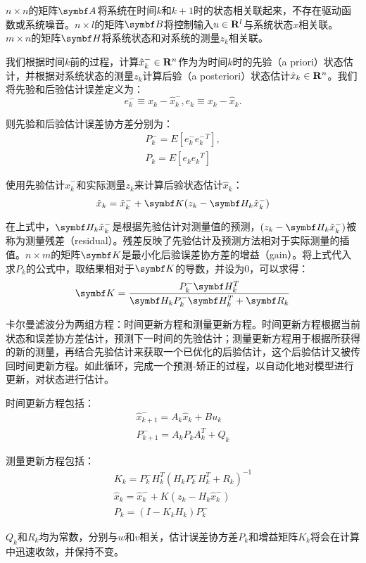   $n\times n$的矩阵$\mat{A}$将系统在时间$k$和$k+1$时的状态相关联起来，不存在驱动函数或系统噪音。$n\times l$的矩阵$\mat{B}$将控制输入$u\in \mathbf{R}^l$与系统状态$x$相关联。$m\times n$的矩阵$\mat{H}$将系统状态和对系统的测量$z_k$相关联。

  我们根据时间$k$前的过程，计算$\hat{x}^{-}_k \in \mathbf{R}^n$作为为时间$k$时的先验（a priori）状态估计，并根据对系统状态的测量$z_k$计算后验（a posteriori）状态估计$\hat{x}_k \in \mathbf{R}^n$。我们将先验和后验估计误差定义为：
$$e^{-}_k \equiv x_k -\hat{x}^{-}_k, e_k \equiv x_k - \hat{x}_k. $$

  则先验和后验估计误差协方差分别为：
\begin{gather*}
P^{-}_k = E[e^{-}_k {e^{-}_k}^T],\\
P_k=E[e_k {e_k}^T]
\end{gather*}

  使用先验估计$\hat{x}^{-}_k$和实际测量$z_k$来计算后验状态估计$\hat{x}_k$：
$$\hat{x}_k = \hat{x}^{-}_k + \mat{K} (z_k - \mat{H}_k \hat{x}^{-}_k)$$

  在上式中，$\mat{H}_k \hat{x}^{-}_k$是根据先验估计对测量值的预测，$(z_k - \mat{H}_k \hat{x}^{-}_k)$被称为测量残差（residual）。残差反映了先验估计及预测方法相对于实际测量的插值。$n\times m$的矩阵$\mat{K}$是最小化后验误差协方差的增益（gain）。将上式代入求$P_k$的公式中，取结果相对于$\mat{K}$的导数，并设为0，可以求得：
$$\mat{K}=\frac{P^{-}_k \mat{H}^T_k}{\mat{H}_k P^{-}_k \mat{H}^T_k + \mat{R}_k}$$

  卡尔曼滤波分为两组方程：时间更新方程和测量更新方程。时间更新方程根据当前状态和误差协方差估计，预测下一时间的先验估计；测量更新方程用于根据所获得的新的测量，再结合先验估计来获取一个已优化的后验估计，这个后验估计又被传回时间更新方程。如此循环，完成一个预测-矫正的过程，以自动化地对模型进行更新，对状态进行估计。

  时间更新方程包括：
\begin{gather*}
\hat{x}^{-}_{k+1}=A_k \hat{x}_k + B u_k \\
P^{-}_{k+1}=A_k P_k A^T_k + Q_k
\end{gather*}

  测量更新方程包括：
\begin{gather*}
K_k=P^{-}_k H^T_k(H_k P^{-}_k H^T_k + R_k)^{-1} \\
\hat{x}_k = \hat{x}^{-}_k + K (z_k - H_k \hat{x}^{-}_k) \\
P_k = (I-K_k H_k)P^{-}_k
\end{gather*}

  $Q_k$和$R_k$均为常数，分别与$w$和$v$相关，估计误差协方差$P_k$和增益矩阵$K_k$将会在计算中迅速收敛，并保持不变。

